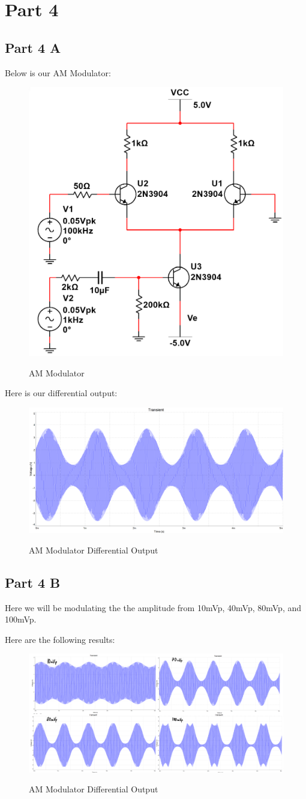 \documentclass[12pt]{article}
\begin{document}
\section{Part 4}
\subsection{Part 4 A}
Below is our AM Modulator:
\begin{figure}[h!]
\centering
\includegraphics[height=0.3\textwidth]{Images/part_4_circuit.png}\\
\caption{AM Modulator}
\label{fig:cirucit}
\end{figure}
\FloatBarrier

Here is our differential output:

\begin{figure}[h!]
\centering
\includegraphics[height=0.4\textwidth]{Images/part_4_a.png}\\
\caption{AM Modulator Differential Output}
\label{fig:Differential Output}
\end{figure}


\subsection{Part 4 B}
Here we will be modulating the the amplitude from 10mVp, 40mVp, 80mVp, and 100mVp.

Here are the following results:

\begin{figure}[h!]
\centering
\includegraphics[height=0.4\textwidth]{Images/part_4_voltages.png}\\
\caption{AM Modulator Differential Output}
\label{fig:Differential Output}
\end{figure}
\FloatBarrier
\end{document}
